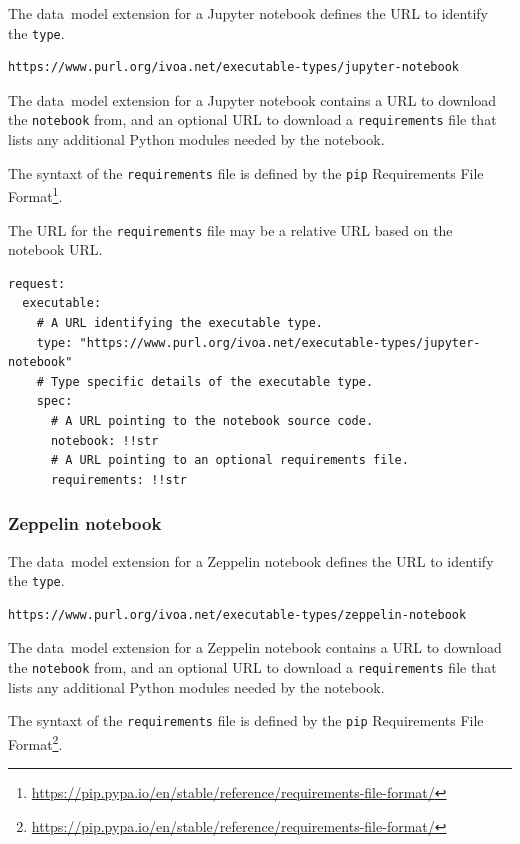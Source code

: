 \documentclass[11pt,a4paper]{ivoa}
\newcommand{\datamodel} {data~model}
\newcommand{\jupyternotebook} {Jupyter notebook}
\newcommand{\python} {Python}
\newcommand{\zeppelin} {Zeppelin}
\newcommand{\codeword}[1] {\texttt{#1}}
\newcommand{\footurl}[1] {\footnote{\url{#1}}}
\begin{document}
The \datamodel{} extension for a \jupyternotebook{} defines the URL
to identify the \codeword{type}.

\begin{lstlisting}[]
https://www.purl.org/ivoa.net/executable-types/jupyter-notebook
\end{lstlisting}

The \datamodel{} extension for a \jupyternotebook{} contains
a URL to download the \codeword{notebook} from, and an optional URL to download a
\codeword{requirements} file that lists any additional \python{} modules
needed by the notebook.

The syntaxt of the \codeword{requirements} file is defined by the \codeword{pip}
Requirements File Format\footurl{https://pip.pypa.io/en/stable/reference/requirements-file-format/}.

The URL for the \codeword{requirements} file may be a relative URL based on the notebook URL.

\begin{lstlisting}[]
request:
  executable:
    # A URL identifying the executable type.
    type: "https://www.purl.org/ivoa.net/executable-types/jupyter-notebook"
    # Type specific details of the executable type.
    spec:
      # A URL pointing to the notebook source code.
      notebook: !!str
      # A URL pointing to an optional requirements file.
      requirements: !!str
\end{lstlisting}

\subsubsection{Zeppelin notebook}
\label{datamodel-zeppelin-notebook}

The \datamodel{} extension for a \zeppelin{} notebook defines the URL
to identify the \codeword{type}.

\begin{lstlisting}[]
https://www.purl.org/ivoa.net/executable-types/zeppelin-notebook
\end{lstlisting}

The \datamodel{} extension for a \zeppelin{} notebook contains
a URL to download the \codeword{notebook} from, and an optional URL to download a
\codeword{requirements} file that lists any additional \python{} modules
needed by the notebook.

The syntaxt of the \codeword{requirements} file is defined by the \codeword{pip}
Requirements File Format\footurl{https://pip.pypa.io/en/stable/reference/requirements-file-format/}.
\end{document}
